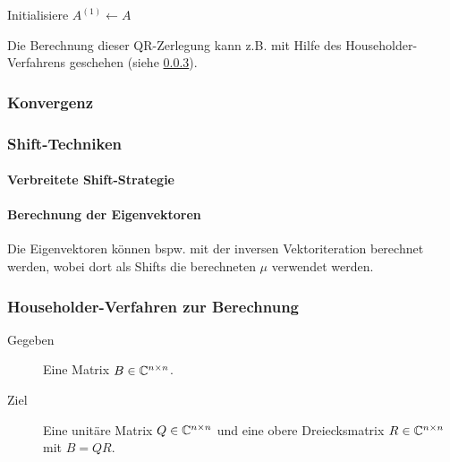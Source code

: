             \begin{algorithm}[H]
	            Initialisiere \( A^{(1)} \gets A \)
	            
            \end{algorithm}
        
            Die Berechnung dieser QR-Zerlegung kann z.B. mit Hilfe des Householder-Verfahrens geschehen (siehe \ref{sec:householder}).

            \subsubsection{Konvergenz}

            \subsubsection{Shift-Techniken}

                \paragraph{Verbreitete Shift-Strategie}

                \paragraph{Berechnung der Eigenvektoren}
	                Die Eigenvektoren können bspw. mit der inversen Vektoriteration berechnet werden, wobei dort als Shifts die berechneten \(\mu\) verwendet werden.

            \subsubsection{Householder-Verfahren zur Berechnung}
	            \label{sec:householder}
	            
                \begin{description}
                	\item[Gegeben] Eine Matrix \( B \in \mathbb{C}^{n \times n} \).
                	\item[Ziel] Eine unitäre Matrix \( Q \in \mathbb{C}^{n \times n} \) und eine obere Dreiecksmatrix \( R \in \mathbb{C}^{n \times n} \) mit \( B = QR \).
                \end{description}
            

